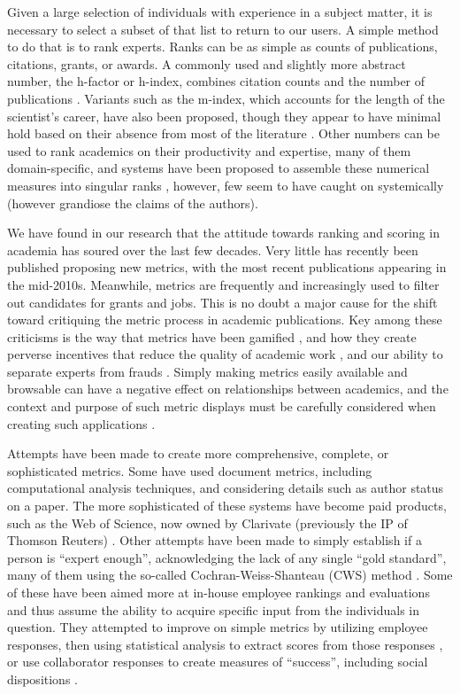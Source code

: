 Given a large selection of individuals with experience in a subject matter, it is necessary to select a subset of that list to return to our users. A simple method to do that is to rank experts. Ranks can be as simple as counts of publications, citations, grants, or awards. A commonly used and slightly more abstract number, the h-factor or h-index, combines citation counts and the number of publications \cite{ref-metrics-methods-web}. Variants such as the m-index, which accounts for the length of the scientist's career, have also been proposed, though they appear to have minimal hold based on their absence from most of the literature \cite{ref-metrics-using-metrics}. Other numbers can be used to rank academics on their productivity and expertise, many of them domain-specific, and systems have been proposed to assemble these numerical measures into singular ranks \cite{ref-metrics-eval-biostat}, however, few seem to have caught on systemically (however grandiose the claims of the authors).

We have found in our research that the attitude towards ranking and scoring in academia has soured over the last few decades. Very little has recently been published proposing new metrics, with the most recent publications appearing in the mid-2010s. Meanwhile, metrics are frequently and increasingly used to filter out candidates for grants and jobs. This is no doubt a major cause for the shift toward critiquing the metric process in academic publications. Key among these criticisms is the way that metrics have been gamified \cite{ref-metrics-manipulation, ref-metrics-games-academics-play}, and how they create perverse incentives that reduce the quality of academic work \cite{ref-metrics-neoliberalism}, and our ability to separate experts from frauds \cite{ref-metrics-perverse-incentives}. Simply making metrics easily available and browsable can have a negative effect on relationships between academics, and the context and purpose of such metric displays must be carefully considered when creating such applications \cite{ref-metrics-resviz}.

Attempts have been made to create more comprehensive, complete, or sophisticated metrics. Some have used document metrics, including computational analysis techniques, and  considering details such as author status on a paper. The more sophisticated of these systems have become paid products, such as the Web of Science, now owned by Clarivate (previously the IP of Thomson Reuters) \cite{ref-metrics-using-metrics}. Other attempts have been made to simply establish if a person is ``expert enough'', acknowledging the lack of any single ``gold standard'', many of them using the so-called Cochran-Weiss-Shanteau (CWS) method \cite{ref-approach-to-identifying-smes}. Some of these have been aimed more at in-house employee rankings and evaluations and thus assume the ability to acquire specific input from the individuals in question. They attempted to improve on simple metrics by utilizing employee responses, then using statistical analysis to extract scores from those responses \cite{ref-metrics-cws-guide}, or use collaborator responses to create measures of ``success'', including social dispositions \cite{ref-metrics-psycho-scale}.

